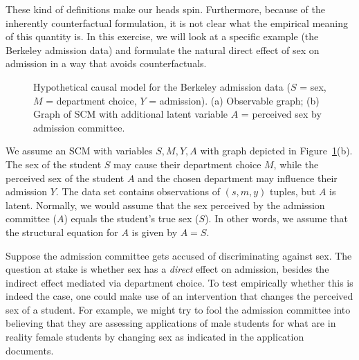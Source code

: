 These kind of definitions make our heads spin. 
Furthermore, because of the inherently counterfactual formulation, it is not clear what the empirical meaning of this quantity is.
In this exercise, we will look at a specific example (the Berkeley admission data) and formulate the natural direct effect of sex on admission in a way that avoids counterfactuals.

\begin{figure}[!h]\centering
{}
\caption{\label{fig:natural_direct_effect_Berkeley}Hypothetical causal model for the Berkeley admission data ($S$ = sex, $M$ = department choice, $Y$ = admission).
  (a) Observable graph; (b) Graph of SCM with additional latent variable $A$ = perceived sex by admission committee.}
\end{figure}

We assume an SCM with variables $S,M,Y,A$ with graph depicted in Figure~\ref{fig:natural_direct_effect_Berkeley}(b).
The sex of the student $S$ may cause their department choice $M$, while the perceived sex of the student $A$ and the chosen department may influence their admission $Y$. 
The data set contains observations of $(s,m,y)$ tuples, but $A$ is latent.
Normally, we would assume that the sex perceived by the admission committee ($A$) equals the student's true sex ($S$).
In other words, we assume that the structural equation for $A$ is given by $A = S$.

Suppose the admission committee gets accused of discriminating against sex.
The question at stake is whether sex has a \emph{direct} effect on admission, besides the indirect effect mediated via department choice.
To test empirically whether this is indeed the case, one could make use of an intervention that changes the perceived sex of a student.
For example, we might try to fool the admission committee into believing that they are assessing applications of male students for what are in reality female students by changing sex as indicated in the application documents.

